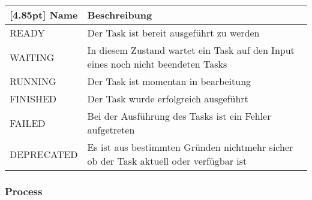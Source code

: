 			\begin{center}
            	\renewcommand{\arraystretch}{1.5}
	            \setlength\tabcolsep{5pt}
            	\begin{tabularx}{\textwidth}{|l|X|}
            		\hline
                    \rowcolor[gray]{0.75}[4.85pt]
            	    Name & Beschreibung \\ \hline
            	    READY & Der Task ist bereit ausgeführt zu werden \\ \hline
            		WAITING & In diesem Zustand wartet ein Task auf den Input eines noch nicht beendeten Tasks \\ \hline
            		RUNNING & Der Task ist momentan in bearbeitung \\ \hline
            		FINISHED & Der Task wurde erfolgreich ausgeführt \\ \hline
            		FAILED & Bei der Ausführung des Tasks ist ein Fehler aufgetreten \\ \hline
            		DEPRECATED & Es ist aus bestimmten Gründen nichtmehr sicher ob der Task aktuell oder verfügbar ist\\ \hline
				\end{tabularx}
			\end{center}
                
    		\subsubsection{Process}
    		

